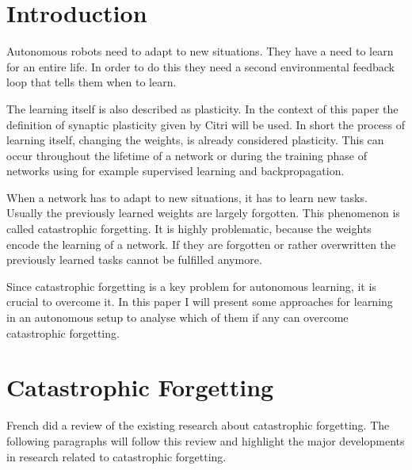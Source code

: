\documentclass[12pt,twoside]{scrartcl}
\theoremstyle{plain}
\theoremstyle{definition}
\theoremstyle{remark}
\begin{document}
\setcounter{tocdepth}{2} 					%
\tableofcontents
{}
\clearpage



\section{Introduction}
\label{sec:introduction}

Autonomous robots need to adapt to new situations. They have a need to learn
for an entire life. In order to do this they need a second environmental feedback
loop that tells them when to learn\cite{Toutounji2016}.

The learning itself is also described as plasticity. In the context of this paper
the definition of synaptic plasticity given by Citri\cite{Citri2008} will be used.
In short the process of learning itself, changing the weights, is already
considered plasticity. This can occur throughout the lifetime of a network or
during the training phase of networks using for example supervised learning
and backpropagation.

When a network has to adapt to new situations, it has to learn new tasks. Usually
the previously learned weights are largely forgotten. This phenomenon is called
catastrophic forgetting\cite{French1999,McCloskey1989}. It is highly problematic,
because the weights encode the learning of a network. If they are forgotten or
rather overwritten the previously learned tasks cannot be fulfilled anymore.

Since catastrophic forgetting is a key problem for autonomous learning, it is
crucial to overcome it. In this paper I will present some approaches for
learning in an autonomous setup to analyse which of them if any can overcome
catastrophic forgetting.

\section{Catastrophic Forgetting}
\label{sec:catastrophicforgetting}

French\cite{French1999} did a review of the existing research about catastrophic
forgetting. The following paragraphs will follow this review and highlight the
major developments in research related to catastrophic forgetting.
\end{document}
